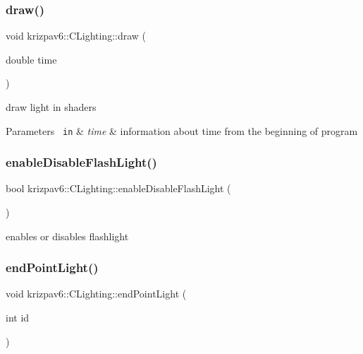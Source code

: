 \subsubsection{\texorpdfstring{draw()}{draw()}}
{\footnotesize\ttfamily void krizpav6\+::\+C\+Lighting\+::draw (\begin{DoxyParamCaption}\item[{double}]{time }\end{DoxyParamCaption})}



draw light in shaders 


\begin{DoxyParams}[1]{Parameters}
\mbox{\texttt{ in}}  & {\em time} & information about time from the beginning of program \\
\hline
\end{DoxyParams}
\mbox{\label{classkrizpav6_1_1_c_lighting_a144ad5a2bfc5b79118ac17b356ac8550}} 
\subsubsection{\texorpdfstring{enableDisableFlashLight()}{enableDisableFlashLight()}}
{\footnotesize\ttfamily bool krizpav6\+::\+C\+Lighting\+::enable\+Disable\+Flash\+Light (\begin{DoxyParamCaption}{ }\end{DoxyParamCaption})}



enables or disables flashlight 

\mbox{\label{classkrizpav6_1_1_c_lighting_af08088f703aab3ea30c995619c033b40}} 
\subsubsection{\texorpdfstring{endPointLight()}{endPointLight()}}
{\footnotesize\ttfamily void krizpav6\+::\+C\+Lighting\+::end\+Point\+Light (\begin{DoxyParamCaption}\item[{int}]{id }\end{DoxyParamCaption})}



